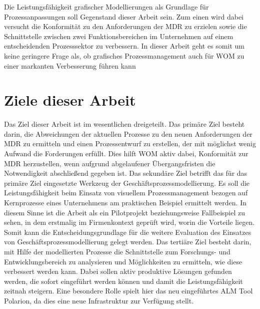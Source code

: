 \documentclass[a4paper,12pt]{report}
\begin{document}
Die Leistungsfähigkeit grafischer Modellierungen als Grundlage für Prozessanpassungen soll Gegenstand dieser Arbeit sein. Zum einen wird dabei versucht die Konformität zu den Anforderungen der MDR zu erzielen sowie die Schnittstelle zwischen zwei Funktionsbereichen im Unternehmen auf einem entscheidenden Prozesssektor zu verbessern. In dieser Arbeit geht es somit um keine geringere Frage als, ob grafisches Prozessmanagement auch für WOM zu einer markanten Verbesserung führen kann

\section{Ziele dieser Arbeit}
Das Ziel dieser Arbeit ist im wesentlichen dreigeteilt. Das primäre Ziel besteht darin, die Abweichungen der aktuellen Prozesse zu den neuen Anforderungen der MDR zu ermitteln und einen Prozessentwurf zu erstellen, der mit möglichst wenig Aufwand die Forderungen erfüllt. Dies hilft WOM aktiv dabei, Konformität zur MDR herzustellen, wenn aufgrund abgelaufener Übergangsfristen die Notwendigkeit abschließend gegeben ist. Das sekundäre Ziel betrifft das für das primäre Ziel eingesetzte Werkzeug der Geschäftsprozessmodellierung. Es soll die Leistungsfähigkeit beim Einsatz von visuellem Prozessmanagement bezogen auf Kernprozesse eines Unternehmens am praktischen Beispiel ermittelt werden. In diesem Sinne ist die Arbeit als ein Pilotprojekt beziehungsweise Fallbeispiel zu sehen, in dem erstmalig im Firmenkontext geprüft wird, worin die Vorteile liegen. Somit kann die Entscheidungsgrundlage für die weitere Evaluation des Einsatzes von Geschäftsprozessmodellierung gelegt werden. Das tertiäre Ziel besteht darin, mit Hilfe der modellierten Prozesse die Schnittstelle zum Forschungs- und Entwicklungsbereich zu analysieren und Möglichkeiten zu ermitteln, wie diese verbessert werden kann. Dabei sollen aktiv produktive Lösungen gefunden werden, die sofort eingeführt werden können und damit die Leistungsfähigkeit zeitnah steigern. Eine besondere Rolle spielt hier das neu eingeführtes ALM Tool Polarion, da dies eine neue Infrastruktur zur Verfügung stellt.
\end{document}
